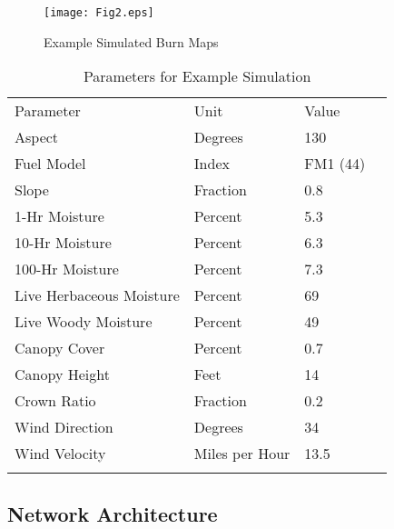 \documentclass[smallcondensed]{svjour3}     %
\begin{document}
\begin{figure}[htb]
\centering
  \texttt{[image: Fig2.eps]}
\caption{Example Simulated Burn Maps}
\label{fig:firePerimeters}       %
\end{figure}

\begin{table}[htb]
\centering
\caption{Parameters for Example Simulation}
\label{tab:paramsExample}       %
\begin{tabular}{llll}
\hline\noalign{\smallskip}
Parameter & Unit & Value \\
\noalign{\smallskip}\hline\noalign{\smallskip}
Aspect & Degrees & 130 \\
Fuel Model & Index & FM1 (44) \\
Slope & Fraction & 0.8 \\
\hline
1-Hr Moisture & Percent & 5.3 \\
10-Hr Moisture & Percent & 6.3 \\
100-Hr Moisture & Percent & 7.3 \\
Live Herbaceous Moisture & Percent & 69 \\
Live Woody Moisture & Percent & 49 \\
\hline
Canopy Cover & Percent & 0.7 \\
Canopy Height & Feet & 14 \\
Crown Ratio & Fraction & 0.2 \\
\hline
Wind Direction & Degrees & 34 \\
Wind Velocity & Miles per Hour & 13.5 \\
\noalign{\smallskip}\hline
\end{tabular}
\end{table}
















\subsection{Network Architecture}
\label{ss:Na}
\end{document}
